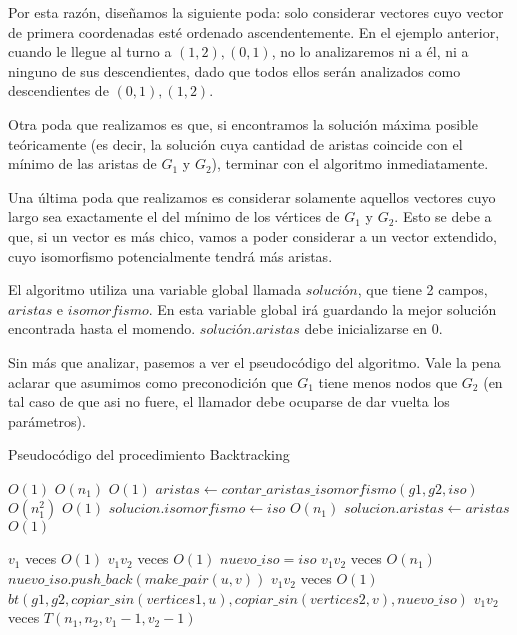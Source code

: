Por esta razón, diseñamos la siguiente poda: solo considerar vectores cuyo vector de primera coordenadas esté ordenado ascendentemente. En el ejemplo anterior, cuando le llegue al turno a ${(1,2), (0,1)}$, no lo analizaremos ni a él, ni a ninguno de sus descendientes, dado que todos ellos serán analizados como descendientes de ${(0,1), (1,2)}$.

Otra poda que realizamos es que, si encontramos la solución máxima posible teóricamente (es decir, la solución cuya cantidad de aristas coincide con el mínimo de las aristas de $G_1$ y $G_2$), terminar con el algoritmo inmediatamente.

Una última poda que realizamos es considerar solamente aquellos vectores cuyo largo sea exactamente el del mínimo de los vértices de $G_1$ y $G_2$. Esto se debe a que, si un vector es más chico, vamos a poder considerar a un vector extendido, cuyo isomorfismo potencialmente tendrá más aristas.

El algoritmo utiliza una variable global llamada $solución$, que tiene 2 campos, $aristas$ e $isomorfismo$. En esta variable global irá guardando la mejor solución encontrada hasta el momendo. $solución.aristas$ debe inicializarse en 0.

Sin más que analizar, pasemos a ver el pseudocódigo del algoritmo. Vale la pena aclarar que asumimos como preconodición que $G_1$ tiene menos nodos que $G_2$ (en tal caso de que asi no fuere, el llamador debe ocuparse de dar vuelta los parámetros).


\begin{algorithm}[H]
  \begin{algorithmic}[1]
  \caption{Pseudocódigo del procedimiento Backtracking}
  \label{algo:2-1}
        \Comment $O(1)$ 
        \State \Return
      \EndIf
        \Comment $O(n_1)$ 
        \State \Return
      \EndIf
        \Comment $O(1)$ 
        \State $aristas \gets contar\_aristas\_isomorfismo(g1, g2, iso)$
        \Comment $O(n_1^2)$ 
          \Comment $O(1)$ 
          \State $solucion.isomorfismo \gets iso$
          \Comment $O(n_1)$ 
          \State $solucion.aristas \gets aristas$
          \Comment $O(1)$ 
        \EndIf
        \State \Return
      \EndIf
      
        \Comment $v_1$ veces $O(1)$ 
          \Comment $v_1 v_2$ veces $O(1)$ 
          \State $nuevo\_iso = iso$
          \Comment $v_1 v_2$ veces $O(n_1)$ 
          \State $nuevo\_iso.push\_back(make\_pair(u,v))$
          \Comment $v_1 v_2$ veces $O(1)$ 
          \State $bt(g1, g2, copiar\_sin(vertices1, u), copiar\_sin(vertices2, v), nuevo\_iso)$
          \Comment $v_1 v_2$ veces $T(n_1, n_2, v_1 - 1, v_2 - 1)$
        \EndFor
      \EndFor
		\EndProcedure
	\end{algorithmic}
\end{algorithm}



